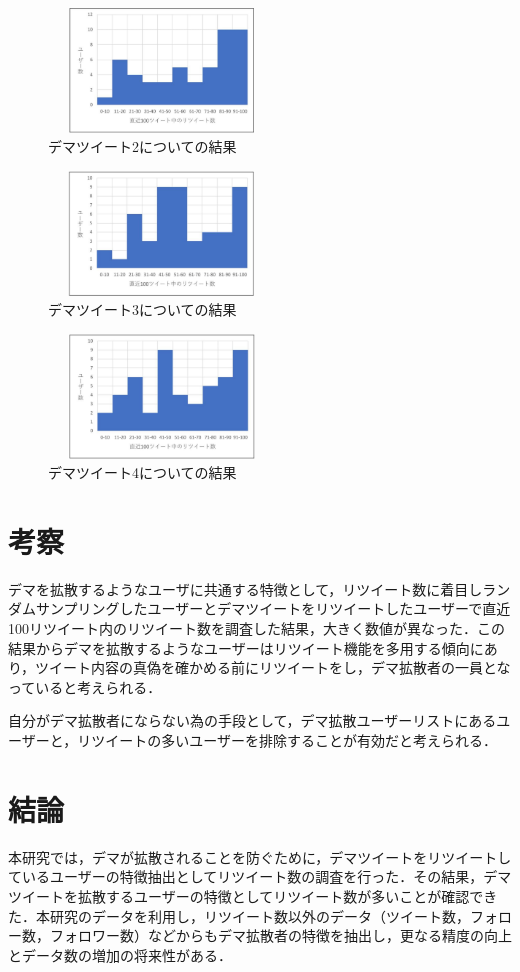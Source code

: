 \documentclass[uplatex,twocolumn]{jsarticle}
\begin{document}
\begin{figure}[htbp]
\centering
\includegraphics[clip,width=6.0cm,height=3.3cm]{d2.pdf}
\caption{デマツイート2についての結果}
\label{ヒストグラム2}
\end{figure}

\begin{figure}[htbp]
\centering
\includegraphics[clip,width=6.0cm,height=3.3cm]{d3.pdf}
\caption{デマツイート3についての結果}
\label{ヒストグラム3}
\end{figure}

\begin{figure}[htbp]
\centering
\includegraphics[clip,width=6.0cm,height=3.3cm]{d4.pdf}
\caption{デマツイート4についての結果}
\label{ヒストグラム4}
\end{figure}

\section{考察}
デマを拡散するようなユーザに共通する特徴として，リツイート数に着目しランダムサンプリングしたユーザーとデマツイートをリツイートしたユーザーで直近100リツイート内のリツイート数を調査した結果，大きく数値が異なった．この結果からデマを拡散するようなユーザーはリツイート機能を多用する傾向にあり，ツイート内容の真偽を確かめる前にリツイートをし，デマ拡散者の一員となっていると考えられる．

自分がデマ拡散者にならない為の手段として，デマ拡散ユーザーリストにあるユーザーと，リツイートの多いユーザーを排除することが有効だと考えられる．

\section{結論}
本研究では，デマが拡散されることを防ぐために，デマツイートをリツイートしているユーザーの特徴抽出としてリツイート数の調査を行った．その結果，デマツイートを拡散するユーザーの特徴としてリツイート数が多いことが確認できた．本研究のデータを利用し，リツイート数以外のデータ（ツイート数，フォロー数，フォロワー数）などからもデマ拡散者の特徴を抽出し，更なる精度の向上とデータ数の増加の将来性がある．

\end{document}
